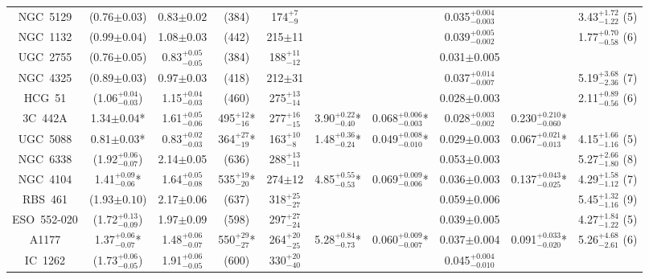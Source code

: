 \begin{table}
\begin{center}
{\begin{tabular}{cccccccccc}
    NGC~5129 & (0.76$\pm0.03$) & 0.83$\pm0.02$ & (384) & 174$^{+7}_{-9}$ & & & 0.035$^{+0.004}_{-0.003}$  & & 3.43$^{+1.72}_{-1.22}$ (5) \\
    NGC~1132 & (0.99$\pm0.04$) & 1.08$\pm0.03$ & (442) & 215$\pm$11 & & & 0.039$^{+0.005}_{-0.002}$ & & 1.77$^{+0.70}_{-0.58}$ (6) \\
    UGC~2755 & (0.76$\pm0.05$) & 0.83$^{+0.05}_{-0.05}$ & (384) & 188$^{+11}_{-12}$ & & & 0.031$\pm$0.005 & & \\
    NGC~4325 & (0.89$\pm0.03$) & 0.97$\pm0.03$ & (418) & 212$\pm$31 & & & 0.037$^{+0.014}_{-0.007}$ & & 5.19$^{+3.68}_{-2.36}$ (7) \\
    HCG~51   & (1.06$^{+0.04}_{-0.03}$) & 1.15$^{+0.04}_{-0.03}$ & (460) & 275$^{+13}_{-14}$ & & & 0.028$\pm$0.003 & & 2.11$^{+0.89}_{-0.56}$ (6) \\
    3C~442A  & 1.34$\pm0.04$* & 1.61$^{+0.05}_{-0.06}$ & 495$^{+12}_{-16}$* & 277$^{+16}_{-15}$ & 3.90$^{+0.22}_{-0.40}$* & 0.068$^{+0.006}_{-0.003}$* & 0.028$^{+0.003}_{-0.002}$ & 0.230$^{+0.210}_{-0.060}$* & \\
    UGC~5088 & 0.81$\pm0.03$* & 0.83$^{+0.02}_{-0.03}$ & 364$^{+27}_{-19}$* & 163$^{+10}_{-8}$ & 1.48$^{+0.36}_{-0.24}$* & 0.049$^{+0.008}_{-0.010}$* & 0.029$\pm$0.003 & 0.067$^{+0.021}_{-0.013}$* & 4.15$^{+1.66}_{-1.16}$ (5) \\
    NGC~6338 & (1.92$^{+0.06}_{-0.07}$) & 2.14$\pm$0.05 & (636) & 288$^{+13}_{-11}$ & & & 0.053$\pm$0.003 & & 5.27$^{+2.66}_{-1.80}$ (8) \\
    NGC~4104 & 1.41$^{+0.09}_{-0.06}$* & 1.64$^{+0.05}_{-0.08}$ & 535$^{+19}_{-20}$* & 274$\pm$12 & 4.85$^{+0.55}_{-0.53}$* & 0.069$^{+0.009}_{-0.006}$* & 0.036$\pm$0.003 & 0.137$^{+0.043}_{-0.025}$* & 4.29$^{+1.58}_{-1.12}$ (7) \\
    RBS~461  & (1.93$\pm0.10$) & 2.17$\pm0.06$ & (637) & 318$^{+25}_{-27}$ & & & 0.059$\pm$0.006 & & 5.45$^{+1.32}_{-1.16}$ (9) \\
    ESO~552-020 & (1.72$^{+0.13}_{-0.09}$) & 1.97$\pm0.09$ & (598) & 297$^{+27}_{-24}$ & & & 0.039$\pm$0.005 & & 4.27$^{+1.84}_{-1.22}$ (5) \\
    A1177    & 1.37$^{+0.06}_{-0.07}$* & 1.48$^{+0.06}_{-0.07}$ & 550$^{+29}_{-27}$* & 264$^{+20}_{-25}$ & 5.28$^{+0.84}_{-0.73}$* & 0.060$^{+0.009}_{-0.007}$* & 0.037$\pm$0.004 & 0.091$^{+0.033}_{-0.020}$* & 5.26$^{+4.68}_{-2.61}$ (6)  \\
    IC~1262  & (1.73$^{+0.06}_{-0.05}$) & 1.91$^{+0.06}_{-0.05}$ & (600) & 330$^{+20}_{-40}$ & & & 0.045$^{+0.004}_{-0.010}$ & & \\

\end{tabular}}
\end{center}
\end{table}
